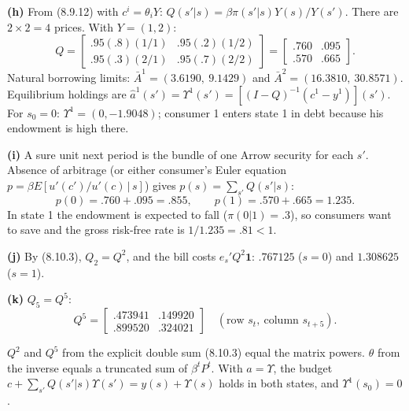 \documentclass[12pt, letterpaper]{article}
\begin{document}
\begin{tcolorbox}[oddbox,title={Exercise 8.7 \quad Two consumers, Markov endowment}]
\textbf{(h)} From (8.9.12) with $c^i=\theta_iY$: $Q(s'|s)=\beta\pi(s'|s)Y(s)/Y(s')$. There are $2\times2=4$
prices. With $Y=(1,2)$:
\[
Q=\begin{bmatrix}.95(.8)(1/1)&.95(.2)(1/2)\\.95(.3)(2/1)&.95(.7)(2/2)\end{bmatrix}
=\begin{bmatrix}.760&.095\\.570&.665\end{bmatrix}.
\]
Natural borrowing limits: $\bar A^1=(3.6190,\ 9.1429)$ and $\bar A^2=(16.3810,\ 30.8571)$. Equilibrium holdings
are $\hat a^1(s')=\Upsilon^1(s')=[(I-Q)^{-1}(c^1-y^1)](s')$. For $s_0=0$: $\Upsilon^1=(0,-1.9048)$; consumer 1
enters state 1 in debt because his endowment is high there.

\textbf{(i)} A sure unit next period is the bundle of one Arrow security for each $s'$. Absence of arbitrage (or
either consumer's Euler equation $p=\beta E[u'(c')/u'(c)\,|\,s]$) gives $p(s)=\sum_{s'}Q(s'|s)$:
\[
p(0)=.760+.095=.855,\qquad p(1)=.570+.665=1.235 .
\]
In state 1 the endowment is expected to fall ($\pi(0|1)=.3$), so consumers want to save and the gross
risk-free rate is $1/1.235=.81<1$.

\textbf{(j)} By (8.10.3), $Q_2=Q^2$, and the bill costs $e_s'Q^2\mathbf1$: $.767125$ ($s=0$) and $1.308625$ ($s=1$).

\textbf{(k)} $Q_5=Q^5$:
\[
Q^5=\begin{bmatrix}.473941&.149920\\.899520&.324021\end{bmatrix}\quad(\text{row }s_t,\ \text{column }s_{t+5}).
\]

\begin{tcolorbox}[databox]
$Q^2$ and $Q^5$ from the explicit double sum (8.10.3) equal the matrix powers. $\theta$ from the inverse equals
a truncated sum of $\beta^tP^t$. With $a=\Upsilon$, the budget $c+\sum_{s'}Q(s'|s)\Upsilon(s')=y(s)+\Upsilon(s)$ holds in
both states, and $\Upsilon^1(s_0)=0$.
\end{tcolorbox}
\end{tcolorbox}
\end{document}
